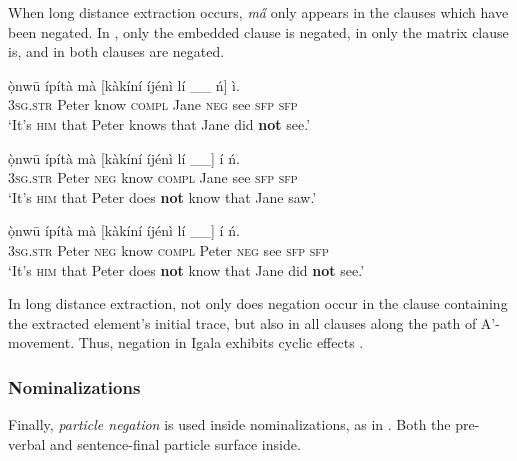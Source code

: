 \documentclass[output=paper,colorlinks,citecolor=brown,
]{langscibook}
\begin{document}
When long distance extraction occurs, \textit{m\H{a}} only appears in the clauses which have been negated. In , only the embedded clause is negated, in  only the matrix clause is, and in  both clauses are negated.


\ea 
\begin{xlist} \ex\label{embneg}\gll  \`{ọ}nw\={u} \'{i}p\'{i}t\`{a} m\`{a} [k\`{a}k\'{i}n\'{i} \'{i}j\'{e}n\`{i}  l\'{i} \_\_ \'{n}] \`{i}.\\
         \textsc{3sg}.\textsc{str} Peter know \textsc{compl} Jane \textsc{neg} see {} \textsc{sfp} \textsc{sfp}\\
    \glt  `It's \textsc{him} that Peter knows that Jane did \textbf{not} see.'
 
    \ex\label{matneg}\gll \`{ọ}nw\={u} \'{i}p\'{i}t\`{a}  m\`{a} [k\`{a}k\'{i}n\'{i} \'{i}j\'{e}n\`{i} l\'{i} \_\_] \'{i} \'{n}.\\
        \textsc{3sg}.\textsc{str} Peter \textsc{neg} know \textsc{compl} Jane see {} \textsc{sfp} \textsc{sfp}\\
    \glt `It's \textsc{him} that Peter does \textbf{not} know that Jane saw.'

    \ex\label{bothneg}\gll \`{ọ}nw\={u} \'{i}p\'{i}t\`{a}  m\`{a} [k\`{a}k\'{i}n\'{i} \'{i}j\'{e}n\`{i}  l\'{i} \_\_] \'{i} \'{n}.\\
        \textsc{3sg}.\textsc{str} Peter \textsc{neg} know \textsc{compl} Peter \textsc{neg} see {} \textsc{sfp} \textsc{sfp} \\
    \glt `It's \textsc{him} that Peter does \textbf{not} know that Jane did \textbf{not} see.'
\end{xlist}
\z

In long distance extraction, not only does negation occur in the clause containing the extracted element's initial trace, but also in all clauses along the path of A'-movement. Thus, negation in Igala exhibits cyclic effects \citep{chomsky1977wh, chomsky1986barriers, chomsky1993minimalist}. 

\subsubsection{Nominalizations}\label{nomz}

Finally, \textit{particle negation} is used inside nominalizations, as in . Both the pre-verbal and sentence-final particle surface inside.
\end{document}
